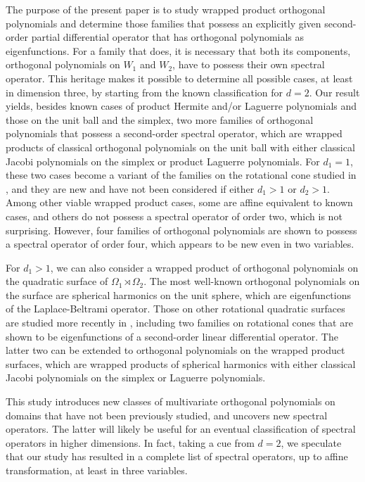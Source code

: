 \documentclass{amsart}
\theoremstyle{remark}
\begin{document}
The purpose of the present paper is to study wrapped product orthogonal polynomials and determine
those families that possess an explicitly given second-order partial differential operator that has orthogonal 
polynomials as eigenfunctions. For a family that does, it is necessary that both its components, orthogonal 
polynomials on $W_1$ and $W_2$, have to possess their own spectral operator. This heritage makes it 
possible to determine all possible cases, at least in dimension three, by starting from the known classification
for $d=2$. Our result yields, besides known cases of product Hermite and/or Laguerre polynomials and those 
on the unit ball and the simplex, two more families of orthogonal polynomials that possess a second-order 
spectral operator, which are wrapped products of classical orthogonal polynomials on the unit ball 
with either classical Jacobi polynomials on the simplex or product Laguerre polynomials. For $d_1 =1$, 
these two cases become a variant of the families on the rotational cone studied in \cite{X20}, and they are 
new and have not been considered if either $d_1 > 1$ or $d_2  >1$. Among other viable wrapped product 
cases, some are affine equivalent to known cases, and others do not possess a spectral operator of order 
two, which is not surprising. However, four families of orthogonal polynomials are shown to possess 
a spectral operator of order four, which appears to be new even in two variables. 

For $d_1 > 1$, we can also consider a wrapped product of orthogonal polynomials on the quadratic surface
of $\Omega_1\!\rtimes \Omega_2$. The most well-known orthogonal polynomials on the surface are 
spherical harmonics on the unit sphere, which are eigenfunctions of the Laplace-Beltrami operator. 
Those on other rotational quadratic surfaces are studied more recently in \cite{X20, X21, X21b, X26}, 
including two families on rotational cones that are shown to be eigenfunctions of a second-order linear 
differential operator. The latter two can be extended to orthogonal polynomials on the wrapped product surfaces, 
which are wrapped products of spherical harmonics with either classical Jacobi polynomials on the simplex or
Laguerre polynomials. 

This study introduces new classes of multivariate orthogonal polynomials on domains that have not been 
previously studied, and uncovers new spectral operators. The latter will likely be useful for an eventual 
classification of spectral operators in higher dimensions. In fact, taking a cue from $d =2$, we speculate 
that our study has resulted in a complete list of spectral operators, up to affine transformation, at least in 
three variables. 
 
\end{document}
